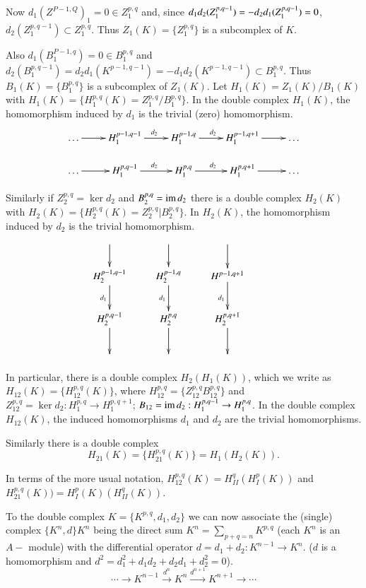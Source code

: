Now $d_1 (Z^{P-1,Q})_1 = 0 \in Z^{p,q}_1 $ and, since $d_1 d_2   (
Z^{p,q-1}_1)\break  = -d_2 d_1 (Z^{p,q-1}_1 ) = 0$,  $d_2 ( Z^{p,q-1}_1 )
\subset  Z^{p,q}_1 $. Thus  $Z_1 (K) = \bigg\{Z^{p,q}_1 \bigg\} $ is  a
subcomplex of $K$. 

Also $ d_1 (B^{P-1,q}_1 ) = 0 \in B^{p,q}_1 $ and  $ d_2 (B^{p,q-1}_1 ) 
= d_2d_1 ( K^{p-1,q-1} ) = -d_1d_2 ( K^{p-1,q-1} ) \subset B^{p,q}_1
$. Thus $ B_1 (K)  = \bigg\{ B^{p,q}_1 \bigg\} $ is a subcomplex of  $
Z_1 (K) $. Let $ H_1 (K) = Z_1 (K) / B_1 (K) $ with $ H_1 (K)
=\bigg\{ H^{p,q}_1 (K) = Z^{p,q}_1 /B^{p,q}_1 \bigg\} $.  In the
double complex $H_1 (K) $, the homomorphism induced by $d_1$ is the
trivial (zero) homomorphism. 
\[
\xymatrix@R=0.5cm{
\ldots \ar[r] & H^{p-1,q-1}_1 \ar[r]^{d_2} & H^{p-1,q}_1 \ar[r]^{d_2}
& H^{p-1, q+1}_1 \ar[r] & \ldots\\
\ldots \ar[r] & H^{p,q-1}_1 \ar[r]^{d_2} & H^{p,q}_1 \ar[r]^{d_2} &
H^{p,q+1}_1 \ar[r] & \ldots
}
\]

Similarly if $ Z^{p,q}_2 = \ker d_2 $ and $B^{p,q}_2 = \operatorname{im} d_2$ there is a
double complex $ H_2 (K) $ with $ H_2 (K) = \bigg\{H^{p,q}_2 (K) =
Z^{p,q}_2| B^{p,q}_2 \bigg\} $. In $ H_2 (K) $, the homomorphism
induced by $d_2$ is the trivial homomorphism. 
\[
\xymatrix{
\ar[d] & \ar[d] & \ar[d]\\
H^{p-1,q-1}_2 \ar[d]_{d_1}& H^{p-1,q}_2 \ar[d]_{d_1}&
H^{p-1,q+1}\ar[d]_{d_1} \\
H^{p,q-1}_2 \ar[d] & H^{p,q}_2 \ar[d] & H^{p,q+1}_2\ar[d]\\
& & & 
}
\]\pageoriginale

In particular, there is a double complex $ H_2 (H_1 (K)) $, which we
write as $ H_{12} (K) = \bigg\{H^{p,q}_{12} (K) \bigg\} $, where $
H^{p,q}_{1 2} = \bigg\{Z^{p,q}_{1 2} B^{p,q}_{1 2} \bigg\} $ and  $
Z^{p,q}_{12} = \ker d_2 : H^{p,q}_1 \rightarrow  H^{p,q+1}_1$; $ B_{1
  2} = \operatorname{im} d_2 : H^{p,q-1}_1 \rightarrow  H^{p,q}_1 $. In the double
complex $H_{1 2} (K) $, the induced homomorphisms $d_1$ and $d_2$ are
the trivial homomorphisms.  

Similarly there is a double complex 
$$H_{21} (K) = \bigg\{ H^{p,q}_{2
  1} (K) \bigg\} = H_1 (H_2 (K)).$$  

In terms of the more usual notation, $ H^{p,q}_{1 2} (K)   = H^q_{II}
( H^p_I  (K) ) $ and $ H^{p,q}_{2 1} (K) ) =  H^{p}_{I} (K) (H^q_{II}
(K) )$. 
 
 To the double complex $ K = \bigg\{ K^{p,q}, d_1,d_2 \bigg\} $  we
 can now associate the (single) complex $ \bigg\{ K^n,d \bigg\} K^n$
 being the direct sum $ K^n = \sum \limits_{p+q =n} K^{p,q} $ (each
 $K^n $ is an $A-$ module) with the differential operator $ d = d_1 +
 d_2 : K^{n-1} \rightarrow K^n$. ($d$ is a homomorphism and  $ d^2
 = d^2_1 + d_1 d_2 + d_2 d_1 + d^2_2 = 0$).   
 $$ 
 \cdots \rightarrow K^{n-1} \xrightarrow{d^n} K^n
 \xrightarrow{d^{n+1}} K^{n+1} \rightarrow \cdots  
 $$
 
